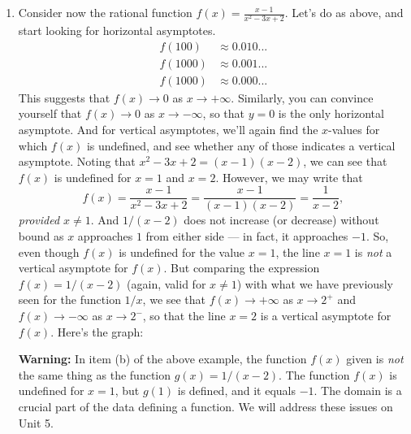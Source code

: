 \documentclass{ximera}
\begin{document}
\begin{example}
\begin{enumerate}
   \item Consider now the rational function $f(x) = \frac{x-1}{x^2-3x+2}$. Let's do as above, and start looking for horizontal asymptotes.
  \begin{align*}
    f(100) &\approx 0.010... \\
    f(1000) &\approx 0.001... \\
    f(1000) &\approx 0.000...
  \end{align*}
  This suggests that $f(x) \to 0$ as $x \to +\infty$. Similarly, you can convince yourself that $f(x) \to 0$ as $x \to -\infty$, so that $y=0$ is the only horizontal asymptote. And for vertical asymptotes, we'll again find the $x$-values for which $f(x)$ is undefined, and see whether any of those indicates a vertical asymptote. Noting that $x^2-3x+2 = (x-1)(x-2)$, we can see that $f(x)$ is undefined for $x=1$ and $x=2$. However, we may write that \[   f(x) = \frac{x-1}{x^2-3x+2} = \frac{x-1}{(x-1)(x-2)} = \frac{1}{x-2},  \]\emph{provided $x \neq 1$}. And $1/(x-2)$ does not increase (or decrease) without bound as $x$ approaches $1$ from either side --- in fact, it approaches $-1$. So, even though $f(x)$ is undefined for the value $x=1$, the line $x=1$ is \emph{not} a vertical asymptote for $f(x)$. But comparing the expression $f(x) = 1/(x-2)$ (again, valid for $x \neq 1$) with what we have previously seen for the function $1/x$, we see that $f(x) \to +\infty$ as $x \to 2^+$ and $f(x) \to -\infty$ as $x \to 2^-$, so that the line $x=2$ is a vertical asymptote for $f(x)$. Here's the graph:

      \begin{image}
      \end{image}

  \begin{callout}
    {\bf Warning:} In item (b) of the above example, the function $f(x)$ given is \emph{not} the same thing as the function $g(x) = 1/(x-2)$. The function $f(x)$ is undefined for $x=1$, but $g(1)$ is defined, and it equals $-1$. The domain is a crucial part of the data defining a function. We will address these issues on Unit 5. 
  \end{callout}
  \end{enumerate}
\end{example}
\end{document}
